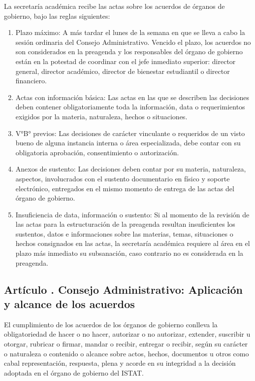 La secretaría académica recibe las actas sobre los acuerdos de órganos de gobierno, bajo las reglas siguientes: 
\begin{enumerate}
\item Plazo máximo: A más tardar el lunes de la semana en que se lleva a cabo la sesión ordinaria del Consejo Administrativo. Vencido el plazo, los acuerdos no son considerados en la preagenda y los responsables del órgano de gobierno están en la potestad de coordinar con el jefe inmediato superior: director general, director académico, director de bienestar estudiantil o director financiero. 
\item Actas con información básica: Las actas en las que se describen las decisiones deben contener obligatoriamente toda la información, data o requerimientos exigidos por la materia, naturaleza, hechos o situaciones. 
\item V°B° previos: Las decisiones de carácter vinculante o requeridos de un visto bueno de alguna instancia interna o área especializada, debe contar con su obligatoria aprobación, consentimiento o autorización. 
\item Anexos de sustento: Las decisiones deben contar por su materia, naturaleza, aspectos, involucrados con el sustento documentario en físico y soporte electrónico, entregados en el mismo momento de entrega de las actas del órgano de gobierno. 
\item Insuficiencia de data, información o sustento: Si al momento de la revisión de las actas para la estructuración de la preagenda resultan insuficientes los sustentos, datos e informaciones sobre las materias, temas, situaciones o hechos consignados en las actas, la secretaría académica requiere al área en el plazo más inmediato su subsanación, caso contrario no es considerada en la preagenda.   
\end{enumerate}
\subsection{Artículo . Consejo Administrativo: Aplicación y alcance de los acuerdos}
\addtocounter{ns}{1}
El cumplimiento de los acuerdos de los órganos de gobierno conlleva la obligatoriedad de hacer o no hacer, autorizar o no autorizar, extender, suscribir u otorgar, rubricar o firmar, mandar o recibir, entregar o recibir, según su carácter o naturaleza o contenido o alcance sobre actos, hechos, documentos u otros como cabal representación, respuesta, plena y acorde en su integridad a la decisión adoptada en el órgano de gobierno del ISTAT. 
